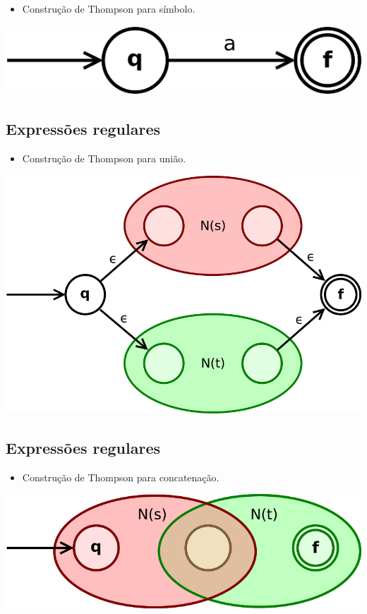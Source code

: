 \documentclass[11pt]{article}
\begin{document}
\begin{itemize}
\item Construção de Thompson para símbolo.
\end{itemize}

\begin{center}
\includegraphics[width=.9\linewidth]{./Thompson-a-symbol.png}
\end{center}
\subsection*{Expressões regulares}
\label{sec:org4a515e7}

\begin{itemize}
\item Construção de Thompson para união.
\end{itemize}
\begin{center}
\includegraphics[width=.9\linewidth]{./Thompson-or.png}
\end{center}
\subsection*{Expressões regulares}
\label{sec:org396166b}

\begin{itemize}
\item Construção de Thompson para concatenação.
\end{itemize}

\begin{center}
\includegraphics[width=.9\linewidth]{./Thompson-concat.png}
\end{center}
\end{document}
